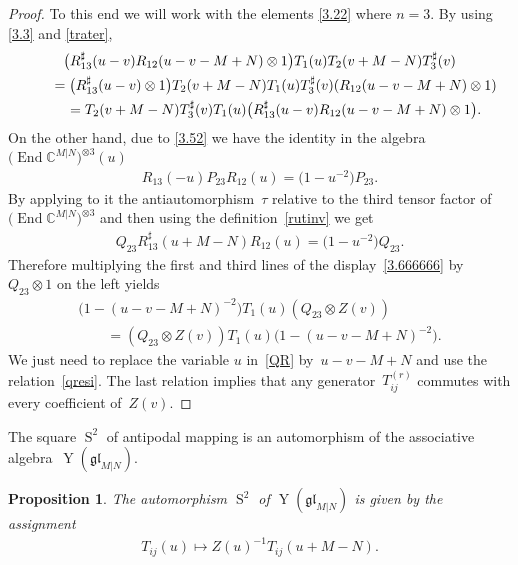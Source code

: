 \documentclass[pdftex]{sigma}
\numberwithin{equation}{section}
\newtheorem{Proposition}[Theorem]{Proposition}
\def\CC{{\mathbb{C}}}
\def\CMN{\CC^{M|N}}
\def\End{\operatorname{End}}
\def\glMN{\mathfrak{gl}_{M|N}}
\def\ot{\otimes}
\def\RS{R^{\sharp}}
\def\S{\operatorname{S}}
\def\TS{T^{\sharp}}
\def\YMN{\operatorname{Y}(\glMN)}
\begin{document}
\begin{proof}
To this end we will work with the elements \eqref{3.22}
where $n=3 $. By using \eqref{3.3} and \eqref{trater},
\begin{gather}
\big(\RS_{13}(u-v) R_{12}(u-v-M+N)\ot1\big)
T_1(u) T_2(v+M-N) \TS_3(v)
\notag
\\
\qquad{}=\big(\RS_{13}(u-v)\ot1\big)
T_2(v+M-N) T_1(u) \TS_3(v)
(R_{12}(u-v-M+N)\ot1)
\notag
\\
\qquad{} =T_2(v+M-N) \TS_3(v) T_1(u)
\big(\RS_{13}(u-v) R_{12}(u-v-M+N)\ot1\big) .\label{3.666666}
\end{gather}
On the other hand, due to \eqref{3.52} we have the identity in the algebra
$\big(\End\CMN\big)^{\ot 3}( u )$
\begin{gather*}
R_{13}(-u) P_{23} R_{12}(u)=\big( 1-u^{-2} \big) P_{23} .
\end{gather*}
By applying to it the antiautomorphism~$\tau$
relative to the third tensor factor of $\big(\End\CMN\big)^{\ot 3}$
and then using the definition~\eqref{rutinv} we get
\begin{gather}\label{QR}
Q_{23} \RS_{13}(u+M-N) R_{12}(u)=\big( 1-u^{-2} \big) Q_{23} .
\end{gather}
Therefore multiplying the first and third lines of the display~\eqref{3.666666} by $Q_{23}\ot1$ on the left yields
\begin{gather*}
\big( 1-(u-v-M+N)^{-2} \big)
T_1(u) (Q_{23}\ot Z(v))\\
\qquad{} = (Q_{23}\ot Z(v)) T_1(u)\big( 1-(u-v-M+N)^{-2} \big) .
\end{gather*}
We just need to replace the variable $u$ in~\eqref{QR} by~$u-v-M+N$
and use the relation~\eqref{qresi}.
The last relation implies that any generator~$T_{ij}^{(r)}$
commutes with every coefficient of~$Z(v)$.
\end{proof}

The square $\S^{2}$ of antipodal mapping is an automorphism of the associative algebra~$\YMN $.

\begin{Proposition}\label{ss}
The automorphism $\S^{2}$ of $\YMN$ is given by the assignment
\begin{gather*}
T_{ij}(u)\mapsto Z(u)^{-1} T_{ij}(u+M-N) .
\end{gather*}
\end{Proposition}
\end{document}
